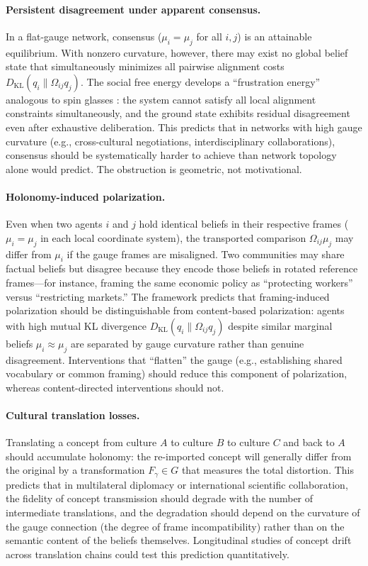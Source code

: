 \documentclass[12pt]{article}
\begin{document}
\paragraph{Persistent disagreement under apparent consensus.} In a flat-gauge network, consensus ($\mu_i = \mu_j$ for all $i,j$) is an attainable equilibrium. With nonzero curvature, however, there may exist no global belief state that simultaneously minimizes all pairwise alignment costs $D_{\mathrm{KL}}(q_i \| \Omega_{ij} q_j)$. The social free energy develops a ``frustration energy'' analogous to spin glasses \citep{mezard1987spin}: the system cannot satisfy all local alignment constraints simultaneously, and the ground state exhibits residual disagreement even after exhaustive deliberation. This predicts that in networks with high gauge curvature (e.g., cross-cultural negotiations, interdisciplinary collaborations), consensus should be systematically harder to achieve than network topology alone would predict. The obstruction is geometric, not motivational.

\paragraph{Holonomy-induced polarization.} Even when two agents $i$ and $j$ hold identical beliefs in their respective frames ($\mu_i = \mu_j$ in each local coordinate system), the transported comparison $\Omega_{ij}\mu_j$ may differ from $\mu_i$ if the gauge frames are misaligned. Two communities may share factual beliefs but disagree because they encode those beliefs in rotated reference frames---for instance, framing the same economic policy as ``protecting workers'' versus ``restricting markets.'' The framework predicts that framing-induced polarization should be distinguishable from content-based polarization: agents with high mutual KL divergence $D_{\mathrm{KL}}(q_i \| \Omega_{ij}q_j)$ despite similar marginal beliefs $\mu_i \approx \mu_j$ are separated by gauge curvature rather than genuine disagreement. Interventions that ``flatten'' the gauge (e.g., establishing shared vocabulary or common framing) should reduce this component of polarization, whereas content-directed interventions should not.

\paragraph{Cultural translation losses.} Translating a concept from culture $A$ to culture $B$ to culture $C$ and back to $A$ should accumulate holonomy: the re-imported concept will generally differ from the original by a transformation $F_\gamma \in G$ that measures the total distortion. This predicts that in multilateral diplomacy or international scientific collaboration, the fidelity of concept transmission should degrade with the number of intermediate translations, and the degradation should depend on the curvature of the gauge connection (the degree of frame incompatibility) rather than on the semantic content of the beliefs themselves. Longitudinal studies of concept drift across translation chains could test this prediction quantitatively.
\end{document}
